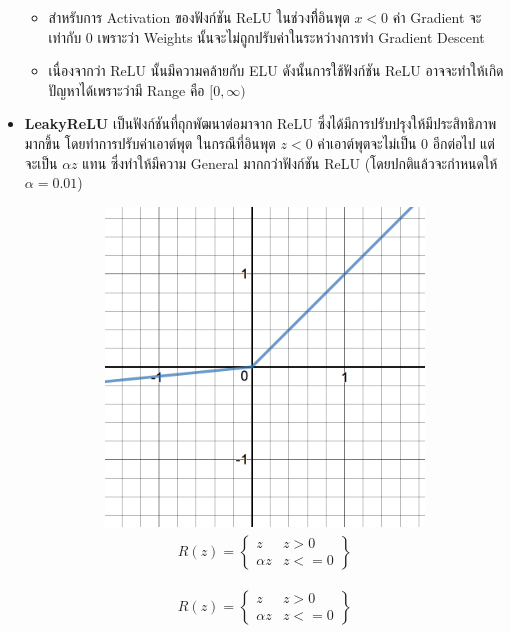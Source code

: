 \begin{itemize}
\begin{itemize}
        \item สำหรับการ Activation ของฟังก์ชัน ReLU ในช่วงที่ิอินพุต $x < 0$ ค่า Gradient จะเท่ากับ 0 เพราะว่า Weights 
        นั้นจะไม่ถูกปรับค่าในระหว่างการทำ Gradient Descent

        \item เนื่องจากว่า ReLU นั้นมีความคล้ายกับ ELU ดังนั้นการใช้ฟังก์ชัน ReLU อาจจะทำให้เกิดปัญหาได้เพราะว่ามี Range คือ $[0,\infty)$
    \end{itemize}

    \item \textbf{LeakyReLU}\autocite{he2015} เป็นฟังก์ชันที่ถุกพัฒนาต่อมาจาก ReLU ซึ่งได้มีการปรับปรุงให้มีประสิทธิภาพมากขึ้น%
    โดยทำการปรับค่าเอาต์พุต ในกรณีที่อินพุต $z < 0$ ค่าเอาต์พุตจะไม่เป็น 0 อีกต่อไป แต่จะเป็น $\alpha z$ แทน ซึ่งทำให้มีความ General 
    มากกว่าฟังก์ชัน ReLU (โดยปกติแล้วจะกำหนดให้ $\alpha = 0.01$)
    \begin{figure}[H]
        \centering
        \begin{subfigure}{0.5\textwidth}
            \centering
            \includegraphics[width=0.9\linewidth]{fig/actfunc_leakyrelu.png}
            \caption{%
                \begin{equation}
                    \begin{split}R(z) = \begin{Bmatrix} z & z > 0 \\
                        \alpha z & z <= 0 \end{Bmatrix}\end{split}

\end{equation}}
\end{subfigure}
\end{figure}
\end{itemize}
